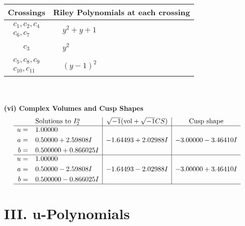 \documentclass[1p]{elsarticle_modified}
\theoremstyle{definition}
\newcommand{\I}{\sqrt{-1}}
\begin{document}
\begin{tabular}{m{50pt}|m{274pt}}
Crossings & \hspace{64pt}Riley Polynomials at each crossing \\
\hline $$\begin{aligned}c_{1},c_{2},c_{4}\\c_{6},c_{7}\end{aligned}$$&$\begin{aligned}
&y^2+y+1
\end{aligned}$\\
\hline $$\begin{aligned}c_{3}\end{aligned}$$&$\begin{aligned}
&y^2
\end{aligned}$\\
\hline $$\begin{aligned}c_{5},c_{8},c_{9}\\c_{10},c_{11}\end{aligned}$$&$\begin{aligned}
&(y-1)^2
\end{aligned}$\\
\hline
\end{tabular}\\~\\
\newpage\flushleft \textbf{(vi) Complex Volumes and Cusp Shapes}
$$\begin{array}{c|c|c}  
\text{Solutions to }I^u_{2}& \I (\text{vol} + \sqrt{-1}CS) & \text{Cusp shape}\\
 \hline 
\begin{aligned}
u &= \phantom{-}1.00000\phantom{ +0.000000I} \\
a &= \phantom{-}0.50000 + 2.59808 I \\
b &= \phantom{-}0.500000 + 0.866025 I\end{aligned}
 & -1.64493 + 2.02988 I & -3.00000 - 3.46410 I \\ \hline\begin{aligned}
u &= \phantom{-}1.00000\phantom{ +0.000000I} \\
a &= \phantom{-}0.50000 - 2.59808 I \\
b &= \phantom{-}0.500000 - 0.866025 I\end{aligned}
 & -1.64493 - 2.02988 I & -3.00000 + 3.46410 I\\
 \hline 
 \end{array}$$\newpage
\newpage\renewcommand{\arraystretch}{1}
\centering \section*{ III. u-Polynomials}
\end{document}
